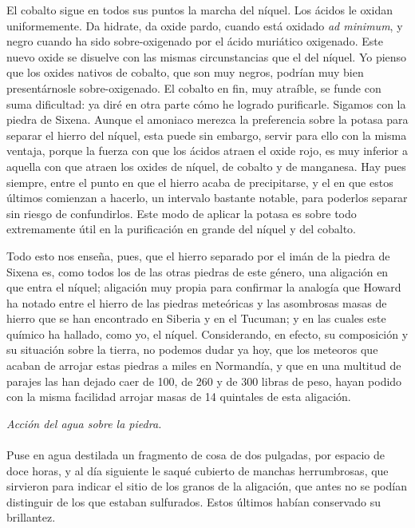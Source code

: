\documentclass[a4paper, 12pt, oneside, spanish]{article}
\begin{document}
El cobalto sigue en todos sus puntos la marcha del níquel. Los ácidos le oxidan uniformemente. Da hidrate, da oxide pardo, cuando está oxidado \emph{ad minimum}, y negro cuando ha sido sobre-oxigenado por el ácido muriático oxigenado. Este nuevo oxide se disuelve con las mismas circunstancias que el del níquel. Yo pienso que los oxides nativos de cobalto, que son muy negros, podrían muy bien presentárnosle sobre-oxigenado. El cobalto en fin, muy atraíble, se funde con suma dificultad: ya diré en otra parte cómo he logrado purificarle. Sigamos con la piedra de Sixena. Aunque el amoniaco merezca la preferencia sobre la potasa para separar el hierro del níquel, esta puede sin embargo, servir para ello con la misma ventaja, porque la fuerza con que los ácidos atraen el oxide rojo, es muy inferior a aquella con que atraen los oxides de níquel, de cobalto y de manganesa. Hay pues siempre, entre el punto en que el hierro acaba de precipitarse, y el en que estos últimos comienzan a hacerlo, un intervalo bastante notable, para poderlos separar sin riesgo de confundirlos. Este modo de aplicar la potasa es sobre todo extremamente útil en la purificación en grande del níquel y del cobalto.

Todo esto nos enseña, pues, que el hierro separado por el imán de la piedra de Sixena es, como todos los de las otras piedras de este género, una aligación en que entra el níquel; aligación muy propia para confirmar la analogía que Howard ha notado entre el hierro de las piedras meteóricas y las asombrosas masas de hierro que se han encontrado en Siberia y en el Tucuman; y en las cuales este químico ha hallado, como yo, el níquel. Considerando, en efecto, su composición y su situación sobre la tierra, no podemos dudar ya hoy, que los meteoros que acaban de arrojar estas piedras a miles en Normandía, y que en una multitud de parajes las han dejado caer de 100, de 260 y de 300 libras de peso, hayan podido con la misma facilidad arrojar masas de 14 quintales de esta aligación.
\begin{center}
\emph{Acción del agua sobre la piedra.}
\end{center}
\paragraph{}
Puse en agua destilada un fragmento de cosa de dos pulgadas, por espacio de doce horas, y al día siguiente le saqué cubierto de manchas herrumbrosas, que sirvieron para indicar el sitio de los granos de la aligación, que antes no se podían distinguir de los que estaban sulfurados. Estos últimos habían conservado su brillantez.
\end{document}
